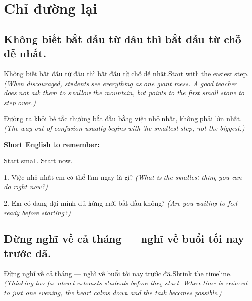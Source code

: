 \chapter{Chỉ đường lại}


\section{Không biết bắt đầu từ đâu thì bắt đầu từ chỗ dễ nhất.}
\begin{truyen}{Không biết bắt đầu từ đâu thì bắt đầu từ chỗ dễ nhất.}{Start with the easiest step.}
\textit{(When discouraged, students see everything as one giant mess. A good teacher does not ask them to swallow the mountain, but points to the first small stone to step over.)}
\end{truyen}

\begin{baihoc}
Đường ra khỏi bế tắc thường bắt đầu bằng việc nhỏ nhất, không phải lớn nhất.
\textit{(The way out of confusion usually begins with the smallest step, not the biggest.)}
\end{baihoc}

\begin{ghinhoanh}
\textbf{Short English to remember:}

Start small. Start now.

\end{ghinhoanh}

\begin{tuhocnhanh}
1. Việc nhỏ nhất em có thể làm ngay là gì? \textit{(What is the smallest thing you can do right now?)}

2. Em có đang đợi mình đủ hứng mới bắt đầu không? \textit{(Are you waiting to feel ready before starting?)}
\end{tuhocnhanh}
\ngancach


\section{Đừng nghĩ về cả tháng — nghĩ về buổi tối nay trước đã.}
\begin{truyen}{Đừng nghĩ về cả tháng — nghĩ về buổi tối nay trước đã.}{Shrink the timeline.}
\textit{(Thinking too far ahead exhausts students before they start. When time is reduced to just one evening, the heart calms down and the task becomes possible.)}
\end{truyen}


